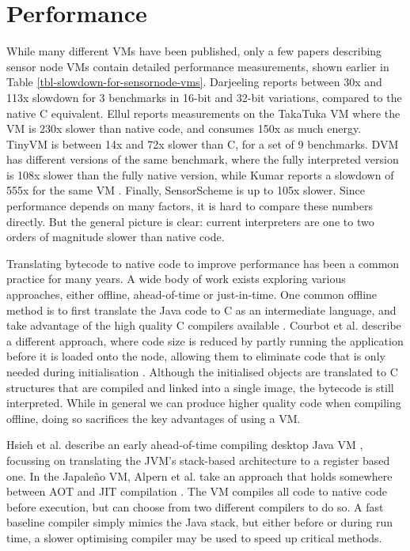 \section{Performance}
While many different VMs have been published, only a few papers describing sensor node VMs contain detailed performance measurements, shown earlier in Table \ref{tbl-slowdown-for-sensornode-vms}. Darjeeling \cite{Brouwers:2009cj} reports between 30x and 113x slowdown for 3 benchmarks in 16-bit and 32-bit variations, compared to the native C equivalent. Ellul \cite{Ellul:2012thesis} reports measurements on the TakaTuka VM \cite{Aslam:2008} where the VM is 230x slower than native code, and consumes 150x as much energy. TinyVM \cite{Hong:2012wj} is between 14x and 72x slower than C, for a set of 9 benchmarks. DVM \cite{Balani:2006} has different versions of the same benchmark, where the fully interpreted version is 108x slower than the fully native version, while Kumar reports a slowdown of 555x for the same VM \cite{Kumar:2007ge}. Finally, SensorScheme \cite{Evers:2010ur} is up to 105x slower. Since performance depends on many factors, it is hard to compare these numbers directly. But the general picture is clear: current interpreters are one to two orders of magnitude slower than native code.

Translating bytecode to native code to improve performance has been a common practice for many years. A wide body of work exists exploring various approaches, either offline, ahead-of-time  or just-in-time. One common offline method is to first translate the Java code to C as an intermediate language, and take advantage of the high quality C compilers available \cite{Dean:1996wb, Muller:1997}. Courbot et al. describe a different approach, where code size is reduced by partly running the application before it is loaded onto the node, allowing them to eliminate code that is only needed during initialisation \cite{Courbot:2010}. Although the initialised objects are translated to C structures that are compiled and linked into a single image, the bytecode is still interpreted. While in general we can produce higher quality code when compiling offline, doing so sacrifices the key advantages of using a VM.

Hsieh et al. describe an early ahead-of-time compiling desktop Java VM \cite{Hsieh:1996cy}, focussing on translating the JVM's stack-based architecture to a register based one. In the Japale\~no VM, Alpern et al. take an approach that holds somewhere between AOT and JIT compilation \cite{Alpern:1999}. The VM compiles all code to native code before execution, but can choose from two different compilers to do so. A fast baseline compiler simply mimics the Java stack, but either before or during run time, a slower optimising compiler may be used to speed up critical methods.

